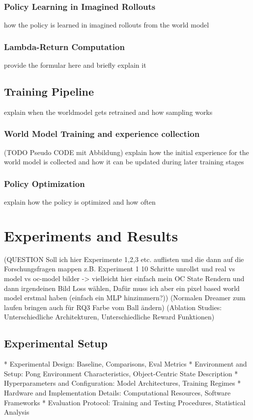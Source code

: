 \documentclass[
	english,
	ruledheaders=section,
	class=report,
	thesis={type=master},
	accentcolor=9c,
	custommargins=true,
	marginpar=false,
	parskip=half-,
	fontsize=11pt,
]{tudapub}
\begin{document}
\subsection{Policy Learning in Imagined Rollouts}
\label{subsec:imagined_rollouts}
how the policy is learned in imagined rollouts from the world model

\subsection{Lambda-Return Computation}
\label{subsec:lambda_returns}
provide the formular here and briefly explain it 

\section{Training Pipeline}
\label{sec:training_pipeline}
explain when the worldmodel gets retrained and how sampling works

\subsection{World Model Training and experience collection}
\label{subsec:world_model_training}
(TODO Pseudo CODE mit Abbildung)
explain how the initial experience for the world model is collected and how it can be updated during later training stages

\subsection{Policy Optimization}
\label{subsec:policy_optimization}
explain how the policy is optimized and how often


\chapter{Experiments and Results}
\label{chap:experiments}
(QUESTION Soll ich hier Experimente 1,2,3 etc. auflisten und die dann auf die Forschungsfragen mappen
z.B. Experiment 1 10 Schritte unrollst und real vs model vs oc-model bilder -> vielleicht hier einfach
mein OC State Rendern und dann irgendeinen Bild Loss wählen, Dafür muss ich aber ein pixel based world model erstmal haben (einfach ein MLP hinzimmern?))
(Normalen Dreamer zum laufen bringen auch für RQ3 Farbe vom Ball ändern)
(Ablation Studies: Unterschiedliche Architekturen, Unterschiedliche Reward Funktionen)


\section{Experimental Setup}
\label{sec:exp_setup}
* Experimental Design: Baseline, Comparisons, Eval Metrics
* Environment and Setup: Pong Environment Characteristics, Object-Centric State Description 
* Hyperparameters and Configuration: Model Architectures, Training Regimes
* Hardware and Implementation Details: Computational Resources, Software Frameworks
* Evaluation Protocol: Training and Testing Procedures, Statistical Analysis
\end{document}
